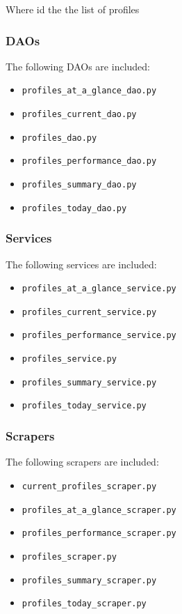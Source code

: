 {\begin{itemize}
	  Where id the the list of profiles

	\end{itemize}

	\subsubsection{DAOs}

	The following DAOs are included:

	\begin{itemize}
	  \item \texttt{profiles\_at\_a\_glance\_dao.py}
	  \item \texttt{profiles\_current\_dao.py}
	  \item \texttt{profiles\_dao.py}
	  \item \texttt{profiles\_performance\_dao.py}
	  \item \texttt{profiles\_summary\_dao.py}
	  \item \texttt{profiles\_today\_dao.py}
	\end{itemize}

	\subsubsection{Services}

	The following services are included:

	\begin{itemize}
	  \item \texttt{profiles\_at\_a\_glance\_service.py}
	  \item \texttt{profiles\_current\_service.py}
	  \item \texttt{profiles\_performance\_service.py}
	  \item \texttt{profiles\_service.py}
	  \item \texttt{profiles\_summary\_service.py}
	  \item \texttt{profiles\_today\_service.py}
	\end{itemize}

	\subsubsection{Scrapers}

	The following scrapers are included:

	\begin{itemize}
	  \item \texttt{current\_profiles\_scraper.py}
	  \item \texttt{profiles\_at\_a\_glance\_scraper.py}
	  \item \texttt{profiles\_performance\_scraper.py}
	  \item \texttt{profiles\_scraper.py}
	  \item \texttt{profiles\_summary\_scraper.py}
	  \item \texttt{profiles\_today\_scraper.py}
	\end{itemize}


}
